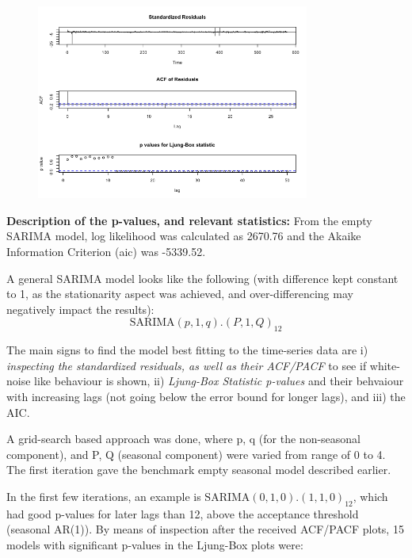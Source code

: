 \documentclass[a4paper,11pt]{article}
\begin{document}
    \begin{figure}[H]
        \centering
        \includegraphics[width=0.8\textwidth]{ha-1_files/figure-markdown_strict/unnamed-chunk-3-5.png}
        \label{fig:f6}
    \end{figure}

    \textbf{Description of the p-values, and relevant statistics:} From the empty SARIMA model, log likelihood was calculated as 2670.76 and the Akaike Information Criterion (aic) was -5339.52. 

    A general SARIMA model looks like the following (with difference kept constant to 1, as the stationarity aspect was achieved, and over-differencing may negatively impact the results):
    \[\text{SARIMA}(p,1,q).(P,1,Q)_{12}\]

    The main signs to find the model best fitting to the time-series data are i) \textit{inspecting the standardized residuals, as well as their ACF/PACF} to see if white-noise like behaviour is shown, ii) \textit{Ljung-Box Statistic p-values} and their behvaiour with increasing lags (not going below the error bound for longer lags), and iii) the AIC. 

    A grid-search based approach was done, where p, q (for the non-seasonal component), and P, Q (seasonal component) were varied from range of 0 to 4. The first iteration gave the benchmark empty seasonal model described earlier. 
    
    In the first few iterations, an example is $\text{SARIMA}(0,1,0).(1,1,0)_{12}$, which had good p-values for later lags than 12, above the acceptance threshold (seasonal AR(1)). By means of inspection after the received ACF/PACF plots, 15 models with significant p-values in the Ljung-Box plots were:

    \vspace{-20pt}
\end{document}
